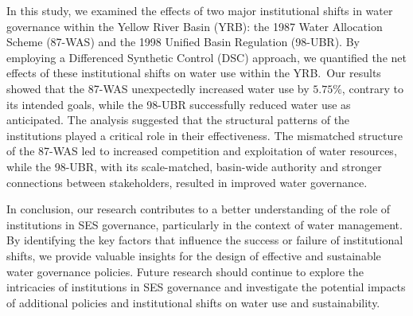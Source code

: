 
In this study, we examined the effects of two major institutional shifts in water governance within the Yellow River Basin (YRB): the 1987 Water Allocation Scheme (87-WAS) and the 1998 Unified Basin Regulation (98-UBR). By employing a Differenced Synthetic Control (DSC) approach, we quantified the net effects of these institutional shifts on water use within the YRB.\
Our results showed that the 87-WAS unexpectedly increased water use by $5.75\%$, contrary to its intended goals, while the 98-UBR successfully reduced water use as anticipated. The analysis suggested that the structural patterns of the institutions played a critical role in their effectiveness. The mismatched structure of the 87-WAS led to increased competition and exploitation of water resources, while the 98-UBR, with its scale-matched, basin-wide authority and stronger connections between stakeholders, resulted in improved water governance.

In conclusion, our research contributes to a better understanding of the role of institutions in SES governance, particularly in the context of water management. By identifying the key factors that influence the success or failure of institutional shifts, we provide valuable insights for the design of effective and sustainable water governance policies. Future research should continue to explore the intricacies of institutions in SES governance and investigate the potential impacts of additional policies and institutional shifts on water use and sustainability.
